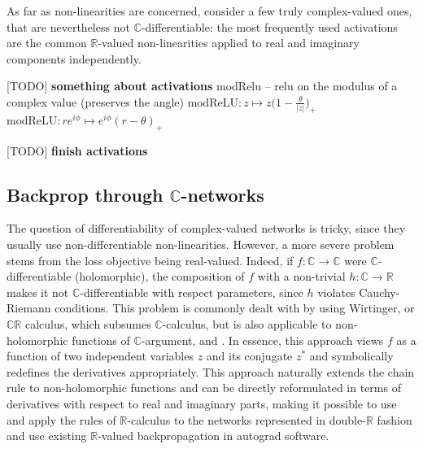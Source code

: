 \documentclass[a4paper,10pt]{article}
\newcommand{\important}[1]{\textbf{\color{red} #1}}
\newcommand{\todo}[1]{{\color{blue} [TODO]} \important{#1}}
\newcommand{\real}{\mathbb{R}}
\newcommand{\hop}{\ast}
\newcommand{\cplx}{\mathbb{C}}
\begin{document}
As far as non-linearities are concerned, \cite{trabelsi_deep_2017} consider a few truly
complex-valued ones, that are nevertheless not $\cplx$-differentiable: the most frequently
used activations are the common $\real$-valued non-linearities applied to real and
imaginary components independently.

\todo{something about activations}
modRelu -- relu on the modulus of a complex value (preserves the angle)
$
\mathrm{modReLU}
  \colon z \mapsto z \bigl(
    1 - \tfrac\theta{\lvert z \rvert}
  \bigr)_+
$
$
\mathrm{modReLU}
  \colon r e^{i \phi} \mapsto e^{i \phi} (r - \theta)_+
$

\todo{finish activations}

\subsection{Backprop through $\cplx$-networks} %
\label{sub:backprop_through_c_networks}

The question of differentiability of complex-valued networks is tricky, since they usually
use non-differentiable non-linearities. However, a more severe problem stems from the loss
objective being real-valued. Indeed, if $f\colon \cplx \to \cplx$ were $\cplx$-differentiable
(holomorphic), the composition of $f$ with a non-trivial $h \colon \cplx\to \real$ makes it
not $\cplx$-differentiable with respect parameters, since $h$ violates Cauchy-Riemann conditions.
This problem is commonly dealt with by using Wirtinger, or $\cplx\real$ calculus, which subsumes
$\cplx$-calculus, but is also applicable to non-holomorphic functions of $\cplx$-argument,
\cite{adali_complex-valued_2011} and \cite{trabelsi_deep_2017}. In essence, this approach
views $f$ as a function of two independent variables $z$ and its conjugate $z^\hop$ and
symbolically redefines the derivatives appropriately. This approach naturally extends the
chain rule to non-holomorphic functions and can be directly reformulated in terms of derivatives
with respect to real and imaginary parts, making it possible to use and apply the rules of
$\real$-calculus to the networks represented in double-$\real$ fashion and use existing
$\real$-valued backpropagation in autograd software.
\end{document}
